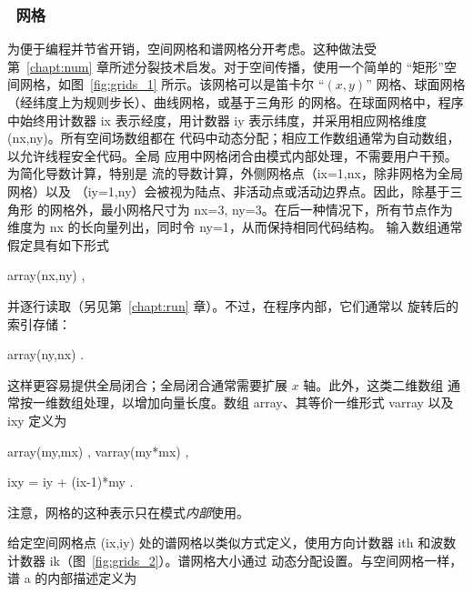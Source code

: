 \vsssub
\subsubsection{~网格} \label{sec:grids}
\vsssub




为便于编程并节省开销，空间网格和谱网格分开考虑。这种做法受
第~\ref{chapt:num} 章所述分裂技术启发。对于空间传播，使用一个简单的
“矩形”空间网格，如图~\ref{fig:grids_1} 所示。该网格可以是笛卡尔
``$(x,y)$'' 网格、球面网格（经纬度上为规则步长）、曲线网格，或基于三角形
的网格。在球面网格中，程序中始终用计数器 {\F ix} 表示经度，用计数器
{\F iy} 表示纬度，并采用相应网格维度 {\F (nx,ny)}。所有空间场数组都在
代码中动态分配；相应工作数组通常为自动数组，以允许线程安全代码。全局
应用中网格闭合由模式内部处理，不需要用户干预。为简化导数计算，特别是
流的导数计算，外侧网格点（{\F ix=1,nx}，除非网格为全局网格）以及
（{\F iy=1,ny}）会被视为陆点、非活动点或活动边界点。因此，除基于三角形
的网格外，最小网格尺寸为 {\F nx=3, ny=3}。在后一种情况下，所有节点作为
维度为 {\F nx} 的长向量列出，同时令 {\F ny=1}，从而保持相同代码结构。
输入数组通常假定具有如下形式

\vspace{\baselineskip} \centerline{\F array(nx,ny) ,} \vspace{\baselineskip}

\noindent
并逐行读取（另见第~\ref{chapt:run} 章）。不过，在程序内部，它们通常以
旋转后的索引存储：

\vspace{\baselineskip} \centerline{\F array(ny,nx) .} \vspace{\baselineskip}

\noindent
这样更容易提供全局闭合；全局闭合通常需要扩展 $x$ 轴。此外，这类二维数组
通常按一维数组处理，以增加向量长度。数组 {\F array}、其等价一维形式
{\F varray} 以及 {\F ixy} 定义为

\vspace{\baselineskip}
\centerline{\F array(my,mx) , varray(my*mx) ,}
\centerline{\F ixy = iy + (ix-1)*my .}
\vspace{\baselineskip}

\noindent
注意，网格的这种表示只在模式{\it 内部}使用。




给定空间网格点 {\F (ix,iy)} 处的谱网格以类似方式定义，使用方向计数器
{\F ith} 和波数计数器 {\F ik}（图~\ref{fig:grids_2}）。谱网格大小通过
动态分配设置。与空间网格一样，谱 {\F a} 的内部描述定义为

